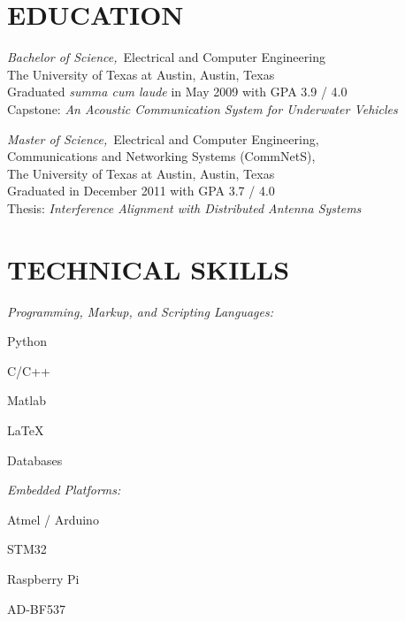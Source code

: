 \documentclass[line,margin=1in]{res}
\begin{document}
\address{1205 Larkwood Drive, Austin, Texas 78723}
\address{512-237-7562 \\ \url{jonstarr@utexas.edu}}
 
\begin{resume}

\section{EDUCATION} 
{\sl Bachelor of Science,}\ Electrical and Computer Engineering \\
  The University of Texas at Austin, Austin, Texas \\
  Graduated \textit{summa cum laude} in May 2009 with GPA 3.9 / 4.0 \\
  Capstone: \textit{An Acoustic Communication System for Underwater Vehicles}~\cite{starr2009acoustic}

{\sl Master of Science,}\ Electrical and Computer Engineering, \\
  Communications and Networking Systems (CommNetS), \\
  The University of Texas at Austin, Austin, Texas \\
  Graduated in December 2011 with GPA 3.7 / 4.0 \\
  Thesis: \textit{Interference Alignment with Distributed Antenna Systems}~\cite{starr2011thesis}

\section{TECHNICAL SKILLS} 
  {\sl Programming, Markup, and Scripting Languages:}
  \vspace*{-0.75\baselineskip}
  \begin{multicols}{5}
    \begin{compactitem}
      \item{Python}
      \item{C/C++}
      \item{Matlab}
      \item{\LaTeX}
      \item{Databases}
    \end{compactitem}
  \end{multicols}

  \vspace*{-1.5\baselineskip}

  {\sl Embedded Platforms:}
  \vspace*{-0.75\baselineskip}
  \begin{multicols}{4}
    \begin{compactitem}
      \item{Atmel / Arduino}
      \item{STM32}
      \item{Raspberry Pi}
      \item{AD-BF537}
    \end{compactitem}
  \end{multicols}


\end{resume}
\end{document}
